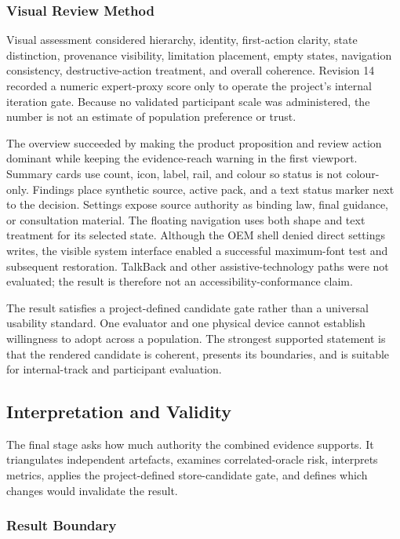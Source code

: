 \subsubsection{Visual Review Method}

Visual assessment considered hierarchy, identity, first-action clarity, state distinction, provenance visibility, limitation placement, empty states, navigation consistency, destructive-action treatment, and overall coherence. Revision 14 recorded a numeric expert-proxy score only to operate the project's internal iteration gate. Because no validated participant scale was administered, the number is not an estimate of population preference or trust.

The overview succeeded by making the product proposition and review action dominant while keeping the evidence-reach warning in the first viewport. Summary cards use count, icon, label, rail, and colour so status is not colour-only. Findings place synthetic source, active pack, and a text status marker next to the decision. Settings expose source authority as binding law, final guidance, or consultation material. The floating navigation uses both shape and text treatment for its selected state. Although the OEM shell denied direct settings writes, the visible system interface enabled a successful maximum-font test and subsequent restoration. TalkBack and other assistive-technology paths were not evaluated; the result is therefore not an accessibility-conformance claim.

The result satisfies a project-defined candidate gate rather than a universal usability standard. One evaluator and one physical device cannot establish willingness to adopt across a population. The strongest supported statement is that the rendered candidate is coherent, presents its boundaries, and is suitable for internal-track and participant evaluation.

\subsection{Interpretation and Validity}

The final stage asks how much authority the combined evidence supports. It triangulates independent artefacts, examines correlated-oracle risk, interprets metrics, applies the project-defined store-candidate gate, and defines which changes would invalidate the result.

\subsubsection{Result Boundary}

